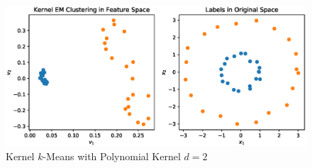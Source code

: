 \documentclass{article}[12pt]
\begin{document}
\begin{figure}
	\centering
	\includegraphics[width=0.8\linewidth]{./img/polynomial_2.eps}
	\caption{Kernel $k$-Means with Polynomial Kernel $d=2$}%
	\label{fig:poly}
\end{figure}
\end{document}
